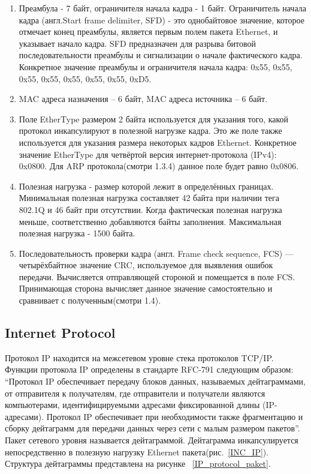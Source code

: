 \begin{enumerate}
	\item Преамбула - 7 байт, ограничителя начала кадра - 1 байт. Ограничитель начала кадра (англ.Start frame delimiter, SFD) - это однобайтовое значение, которое отмечает конец преамбулы, является первым полем пакета Ethernet, и указывает начало кадра. SFD предназначен для разрыва битовой последовательности преамбулы и сигнализации о начале фактического кадра. Конкретное значение преамбулы и ограничителя начала кадра: 0x55, 0x55, 0x55, 0x55, 0x55, 0x55, 0x55, 0xD5.
	\item MAC адреса назначения – 6 байт, MAC адреса источника – 6 байт.
	\item Поле EtherType размером 2 байта используется для указания того, какой протокол инкапсулируют в полезной нагрузке кадра. Это же поле также используется для указания размера некоторых кадров Ethernet. Конкретное значение EtherType для четвёртой версия интернет-протокола (IPv4): 0x0800. Для ARP протокола(смотри 1.3.4) данное поле будет равно 0x0806.
	\item Полезная нагрузка - размер которой лежит в определённых границах. Минимальная полезная нагрузка составляет 42 байта при наличии тега 802.1Q и 46 байт при отсутствии. Когда фактическая полезная нагрузка меньше, соответственно добавляются байты заполнения. Максимальная полезная нагрузка - 1500 байта.  
	\item Последовательность проверки кадра (англ. Frame check sequence, FCS) — четырёхбайтное значение CRC, используемое для выявления ошибок передачи. Вычисляется отправляющей стороной и помещается в поле FCS. Принимающая сторона вычисляет данное значение самостоятельно и сравнивает с полученным(смотри 1.4).
\end{enumerate}

\subsection{Internet Protocol}
Протокол IP находится на межсетевом уровне стека протоколов TCP/IP. Функции протокола IP определены в стандарте RFC-791 следующим образом: “Протокол IP обеспечивает передачу блоков данных, называемых дейтаграммами, от отправителя к получателям, где отправители и получатели являются компьютерами, идентифицируемыми адресами фиксированной длины (IP-адресами). Протокол IP обеспечивает при необходимости также фрагментацию и сборку дейтаграмм для передачи данных через сети с малым размером пакетов”. Пакет сетевого уровня называется дейтаграммой. Дейтаграмма инкапсулируется непосредственно в полезную нагрузку Ethernet пакета(рис.~\ref{INC_IP}).
Структура дейтаграммы представлена на рисунке ~\ref{IP_protocol_paket}.

